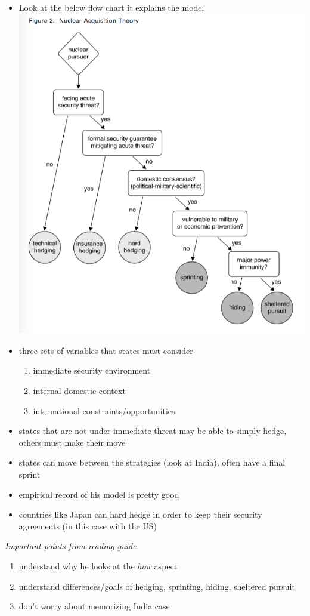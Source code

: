 \documentclass{article}
\begin{document}
\begin{itemize}
    \item Look at the below flow chart it explains the model\\
    \includegraphics[width=\textwidth]{narangmodel.png}
    \item three sets of variables that states must consider
    \begin{enumerate}
        \item immediate security environment
        \item internal domestic context
        \item international constraints/opportunities
    \end{enumerate}
    \item states that are not under immediate threat may be able to simply hedge, others must make their move
    \item states can move between the strategies (look at India), often have a final sprint
    \item empirical record of his model is pretty good
    \item countries like Japan can hard hedge in order to keep their security agreements (in this case with the US)
\end{itemize}
\textit{Important points from reading guide}
\begin{enumerate}
    \item understand why he looks at the \textit{how} aspect
    \item understand differences/goals of hedging, sprinting, hiding, sheltered pursuit
    \item don't worry about memorizing India case
\end{enumerate}
\end{document}
